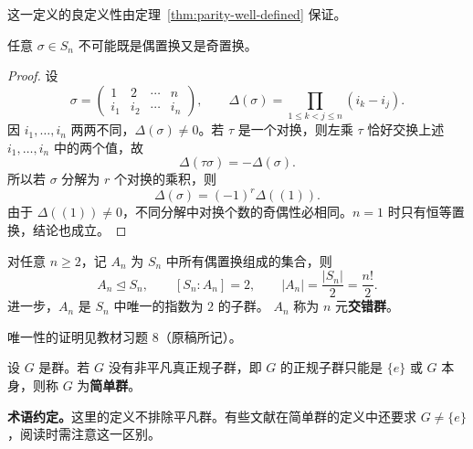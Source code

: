 \begin{purplenote}
这一定义的良定义性由定理~\ref{thm:parity-well-defined} 保证。
\end{purplenote}

\begin{theorem}\label{thm:parity-well-defined}
任意 $\sigma\in S_n$ 不可能既是偶置换又是奇置换。
\end{theorem}

\begin{proof}
设
\[
  \sigma=\begin{pmatrix}
    1&2&\cdots&n\\
    i_1&i_2&\cdots&i_n
  \end{pmatrix},
  \qquad
  \Delta(\sigma)=\prod_{1\leq k<j\leq n}(i_k-i_j).
\]
因 $i_1,\ldots,i_n$ 两两不同，$\Delta(\sigma)\neq0$。若 $\tau$ 是一个对换，则左乘 $\tau$ 恰好交换上述 $i_1,\ldots,i_n$ 中的两个值，故
\[
  \Delta(\tau\sigma)=-\Delta(\sigma).
\]
所以若 $\sigma$ 分解为 $r$ 个对换的乘积，则
\[
  \Delta(\sigma)=(-1)^r\Delta((1)).
\]
由于 $\Delta((1))\neq0$，不同分解中对换个数的奇偶性必相同。$n=1$ 时只有恒等置换，结论也成立。
\end{proof}

\begin{theorem}\label{thm:alternating-group}
对任意 $n\geq2$，记 $A_n$ 为 $S_n$ 中所有偶置换组成的集合，则
\[
  A_n\trianglelefteq S_n,\qquad
  [S_n:A_n]=2,\qquad |A_n|=\frac{|S_n|}{2}=\frac{n!}{2}.
\]
进一步，$A_n$ 是 $S_n$ 中唯一的指数为 $2$ 的子群。
$A_n$ 称为 $n$ 元\textbf{交错群}。
\end{theorem}

\begin{purplenote}
唯一性的证明见教材习题 $8$（原稿所记）。
\end{purplenote}

\begin{definition}[简单群]\label{def:simple-group}
设 $G$ 是群。若 $G$ 没有非平凡真正规子群，即 $G$ 的正规子群只能是 $\{e\}$ 或 $G$ 本身，则称 $G$ 为\textbf{简单群}。
\end{definition}

\par\textbf{术语约定。}这里的定义不排除平凡群。有些文献在简单群的定义中还要求 $G\neq\{e\}$，阅读时需注意这一区别。

